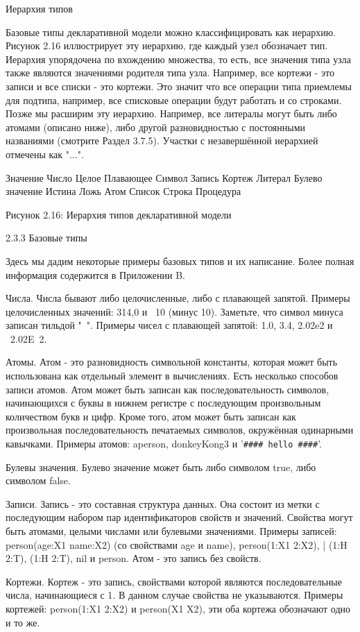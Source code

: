 Иерархия типов

Базовые типы декларативной модели можно классифицировать как иерархию. Рисунок 2.16 иллюстрирует эту иерархию, где каждый узел обозначает тип. Иерархия упорядочена по вхождению множества, то есть, все значения типа узла также являются значениями родителя типа узла. Например, все кортежи - это записи и все списки - это кортежи. Это значит что все операции типа приемлемы для подтипа, например, все списковые операции будут работать и со строками. Позже мы расширим эту иерархию. Например, все литералы могут быть либо атомами (описано ниже), либо другой разновидностью с постоянными названиями (смотрите Раздел 3.7.5). Участки с незавершённой иерархией отмечены как "...".

Значение
Число
Целое
Плавающее
Символ
Запись
Кортеж
Литерал
Булево значение
Истина
Ложь
Атом
Список
Строка
Процедура

Рисунок 2.16: Иерархия типов декларативной модели

2.3.3 Базовые типы

Здесь мы дадим некоторые примеры базовых типов и их написание. Более полная информация содержится в Приложении B.

Числа. Числа бывают либо целочисленные, либо с плавающей запятой. Примеры целочисленных значений: 314,0 и ~10 (минус 10). Заметьте, что символ минуса записан тильдой "~". Примеры чисел с плавающей запятой: 1.0, 3.4, 2.02e2 и ~2.02E~2.

Атомы. Атом - это разновидность символьной константы, которая может быть использована как отдельный элемент в вычислениях. Есть несколько способов записи атомов. Атом может быть записан как последовательность символов, начинающихся с буквы в нижнем регистре с последующим произвольным количеством букв и цифр. Кроме того, атом может быть записан как произвольная последовательность печатаемых символов, окружённая одинарными кавычками. Примеры атомов: aperson, donkeyKong3 и '\lstinline|#### hello ####|'.

Булевы значения. Булево значение может быть либо символом true, либо символом false.

Записи. Запись - это составная структура данных. Она состоит из метки с последующим набором пар идентификаторов свойств и значений. Свойства могут быть атомами, целыми числами или булевыми значениями. Примеры записей: person(age:X1 name:X2) (со свойствами age и name),  person(1:X1 2:X2),  | (1:H 2:T), (1:H 2:T), nil и person. Атом - это запись без свойств.

Кортежи. Кортеж - это запись, свойствами которой являются последовательные числа, начинающиеся с 1. В данном случае свойства не указываются. Примеры кортежей: person(1:X1 2:X2) и person(X1 X2), эти оба кортежа обозначают одно и то же.

